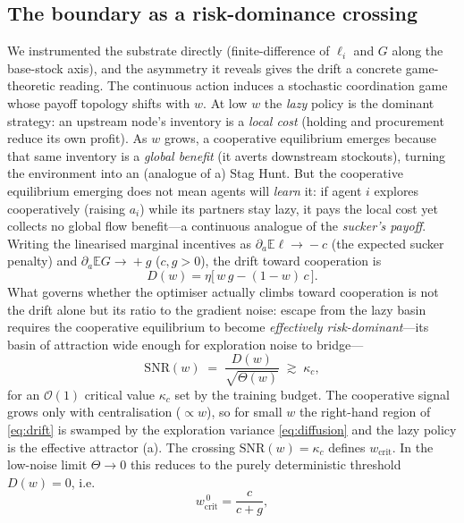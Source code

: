 \documentclass[letterpaper]{article}
\theoremstyle{plain}
\newcommand{\wcrit}{w_{\mathrm{crit}}}
\begin{document}
\subsection{The boundary as a risk-dominance crossing}
We instrumented the substrate directly (finite-difference of $\ell_i$ and $G$
along the base-stock axis), and the asymmetry it reveals gives the drift a
concrete game-theoretic reading. The continuous action induces a stochastic
coordination game whose payoff topology shifts with $w$. At low $w$ the
\emph{lazy} policy is the dominant strategy: an upstream node's inventory is a
\emph{local cost} (holding and procurement reduce its own profit). As $w$ grows,
a cooperative equilibrium emerges because that same inventory is a \emph{global
benefit} (it averts downstream stockouts), turning the environment into an
(analogue of a) Stag Hunt. But the cooperative equilibrium emerging does not mean
agents will \emph{learn} it: if agent $i$ explores cooperatively (raising $a_i$)
while its partners stay lazy, it pays the local cost yet collects no global flow
benefit---a continuous analogue of the \emph{sucker's payoff}. Writing the
linearised marginal incentives as $\partial_a\mathbb{E}\ell\!\to\!-c$ (the
expected sucker penalty) and $\partial_a\mathbb{E}G\!\to\!+g$ ($c,g>0$), the
drift toward cooperation is
\begin{equation}
  D(w)=\eta\big[\,w\,g-(1-w)\,c\,\big].
  \label{eq:drift}
\end{equation}
What governs whether the optimiser actually climbs toward cooperation is not the
drift alone but its ratio to the gradient noise: escape from the lazy basin
requires the cooperative equilibrium to become \emph{effectively
risk-dominant}---its basin of attraction wide enough for exploration noise to
bridge---
\begin{equation}
  \mathrm{SNR}(w)\;=\;\frac{D(w)}{\sqrt{\Theta(w)}}\;\gtrsim\;\kappa_c ,
  \label{eq:snr}
\end{equation}
for an $\mathcal{O}(1)$ critical value $\kappa_c$ set by the training
budget. The cooperative signal grows only with centralisation
($\propto w$), so for small $w$ the right-hand region of \eqref{eq:drift}
is swamped by the exploration variance \eqref{eq:diffusion} and the lazy
policy is the effective attractor (a). The crossing
$\mathrm{SNR}(w)=\kappa_c$ defines $\wcrit$. In the low-noise limit
$\Theta\!\to\!0$ this reduces to the purely deterministic threshold
$D(w)=0$, i.e.
\begin{equation}
  \wcrit^{\,0}=\frac{c}{c+g},
  \label{eq:wcrit}
\end{equation}
\end{document}
